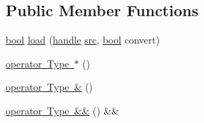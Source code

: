 \subsection*{Public Member Functions}
\begin{DoxyCompactItemize}
\item 
\mbox{\hyperlink{asdl_8h_af6a258d8f3ee5206d682d799316314b1}{bool}} \mbox{\hyperlink{structtype__caster_3_01_type_00_01enable__if__t_3_01is__eigen__dense__plain_3_01_type_01_4_1_1value_01_4_01_4_a685eaafb5ace9e29ba92080349ee523d}{load}} (\mbox{\hyperlink{classhandle}{handle}} \mbox{\hyperlink{_s_d_l__opengl__glext_8h_a72e0fdf0f845ded60b1fada9e9195cd7}{src}}, \mbox{\hyperlink{asdl_8h_af6a258d8f3ee5206d682d799316314b1}{bool}} convert)
\item 
\mbox{\hyperlink{structtype__caster_3_01_type_00_01enable__if__t_3_01is__eigen__dense__plain_3_01_type_01_4_1_1value_01_4_01_4_a643991d05a4ae6694d05d26fcbc27daf}{operator Type $\ast$}} ()
\item 
\mbox{\hyperlink{structtype__caster_3_01_type_00_01enable__if__t_3_01is__eigen__dense__plain_3_01_type_01_4_1_1value_01_4_01_4_a9d69cb89b1feafb9b8654781237aecc4}{operator Type \&}} ()
\item 
\mbox{\hyperlink{structtype__caster_3_01_type_00_01enable__if__t_3_01is__eigen__dense__plain_3_01_type_01_4_1_1value_01_4_01_4_a89a2d0fe1913916aff8d6f65d52523b8}{operator Type \&\&}} () \&\&
\end{DoxyCompactItemize}

